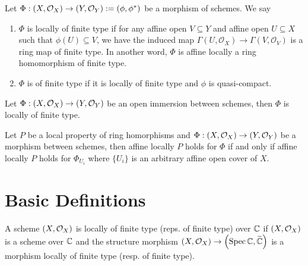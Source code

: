 \begin{definition}
Let $\Phi : \left(X, \mathcal{O}_{X}\right) \to \left(Y, \mathcal{O}_{Y}\right) := (\phi, \phi^*)$ be a morphism of schemes. We say
\begin{enumerate}
    \item $\Phi$ is locally of finite type if for any affine open $V \subseteq Y$ and affine open $U \subseteq X$ such that $\phi(U) \subseteq V$, we have the induced map $\Gamma(U, \mathcal{O}_X) \to \Gamma(V, \mathcal{O}_V)$ is a ring map of finite type. In another word, $\Phi$ is affine locally a ring homomorphism of finite type.
    \item $\Phi$ is of finite type if it is locally of finite type and $\phi$ is quasi-compact.
\end{enumerate}
\end{definition}

\begin{proposition}\label{thm:affine-locally-open-immersion}
  Let $\Phi : \left(X, \mathcal{O}_{X}\right) \to \left(Y, \mathcal{O}_{Y}\right)$ be an open immersion between schemes, then $\Phi$ is locally of finite type.
\end{proposition}

\begin{proposition}\label{thm:affine-locally-source-cover}
  Let $P$ be a local property of ring homorphisms and $\Phi : \left(X, \mathcal{O}_{X}\right) \to \left(Y, \mathcal{O}_{Y}\right)$ be a morphism between schemes, then affine locally $P$ holds for $\Phi$ if and only if affine locally $P$ holds for $\Phi_{U_i}$ where $\{U_i\}$ is an arbitrary affine open cover of $X$.
\end{proposition}


\section{Basic Definitions}

\begin{definition}\label{def:SchemeLocallyOfFiniteType}
  A scheme $\left(X, \mathcal{O}_{X}\right)$ is locally of finite type (reps. of finite type) over $\mathbb{C}$ if $\left(X, \mathcal{O}_{X}\right)$ is a scheme over $\mathbb{C}$ and the structure morphism $\left(X, \mathcal{O}_{X}\right) \to \left(\operatorname*{Spec}{\mathbb{C}}, \widetilde{\mathbb{C}}\right)$ is a morphism locally of finite type (resp. of finite type). 
\end{definition}

